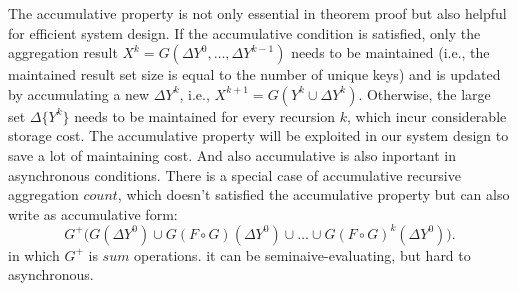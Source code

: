 \begin{comment}
\begin{proof}
	\label{sec:app:proof:monotonic}
	It is known that $\Delta Y^k=F(\Delta X^k)$and $\Delta X^0=X^0$.
	\begin{align}
	&G\Big(\Delta Y^0\cup (F\circ G)(\Delta Y^0)\cup\ldots\cup (F\circ G)^k(\Delta Y^0)\Big)\tag{1} \\
	=&G\Big(G(\Delta Y^0)\cup (F\circ G)(\Delta Y^0)\cup \ldots \cup (F\circ G)^k( \Delta Y^0)\Big)\tag{2}\\
	=&G\Big(F\circ G(\Delta Y^0)\cup (F\circ G)^2(\Delta Y^0)\cup \ldots \cup (F\circ G)^k(\Delta Y^0)\Big) \tag{3}\\
	=& \ldots \notag \\
	=&G\Big((F\circ G)^k(\Delta Y^0)\Big)\tag{4}\\
	=&(G \circ F)^{k+1}(X^0).\tag{5}
	\end{align}
	Line 3 is true because of the accumulative property. Due to the monotonic property line 4 is true .By repeat applying these two properties, we can reduce the original formula to line 5, the result of normal recursive aggregation. 
\end{proof}
\end{comment}

The accumulative property is not only essential in theorem proof but also helpful for efficient system design. If the accumulative condition is satisfied, only the aggregation result $X^k=G(\Delta Y^{0},\ldots,\Delta Y^{k-1})$ needs to be maintained (i.e., the maintained result set size is equal to the number of unique keys) and is updated by accumulating a new $\Delta Y^{k}$, i.e., $X^{k+1}=G(Y^k \cup \Delta Y^k)$. Otherwise, the large set $\Delta \{Y^{k}\}$ needs to be maintained for every recursion $k$, which incur considerable storage cost. The accumulative property will be exploited in our system design to save a lot of maintaining cost. And also accumulative is also inportant in asynchronous conditions.
There is a special case of accumulative recursive aggregation $count$, which doesn't satisfied the accumulative property but can also write as accumulative form:
\begin{equation}
\label{eq:accumasyncres}
G^+\Big(G(\Delta Y^0)\cup G(F\circ G)(\Delta Y^0)\cup\ldots\cup G(F\circ G)^k(\Delta Y^0)\Big).
\end{equation}
in which $G^+$ is $sum$ operations. it can be seminaive-evaluating, but hard to asynchronous.


